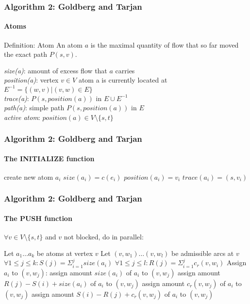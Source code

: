 \documentclass{beamer}
\begin{document}
\begin{frame}
\frametitle{Algorithm 2: Goldberg and Tarjan}
\framesubtitle{Atoms}
\begin{block}{Definition: Atom}
An atom $a$ is the maximal quantity of flow that so far moved the exact path $P(s,v)$.\\
\end{block}

\textit{size(a)}: amount of excess flow that $a$ carries \\
\textit{position(a)}: vertex $v\in V$ atom a is currently located at\\
$E^{-1} = \{(w,v)\vert (v,w) \in E \}$ \\
\textit{trace(a)}: $P(s, position(a))$ in $E \cup  E^{-1}$ \\
\textit{path(a)}: simple path $P(s, position(a))$ in $E$ \\
\textit{active atom}: $position(a) \in V \setminus \{s, t\}$
\end{frame}

\begin{frame}
\frametitle{Algorithm 2: Goldberg and Tarjan}
\framesubtitle{The INITIALIZE function}
	\begin{algorithmic}[1]
		\State create new atom $a_i$
		\State $size(a_i) = c(e_i)$
		\State $position(a_i) = v_i$
		\State $trace(a_i) = (s,v_i)$		
	\EndFor
	\EndFunction
	\end{algorithmic}
\end{frame}

\begin{frame}[shrink]
\frametitle{Algorithm 2: Goldberg and Tarjan}
\framesubtitle{The PUSH function}
$\forall v \in V \setminus \{s,t\}$ and $v$ not blocked, do in parallel:
	\begin{algorithmic}[1]
	\State Let $a_1 \dots a_k$ be atoms at vertex $v$
	\State Let $(v,w_1) \dots (v,w_l)$ be admissible arcs at $v$
	\State $\forall 1 \leq j \leq k: S(j) = \Sigma_{i=1}^{j} size(a_i)$
	\State $\forall 1 \leq j \leq l: R(j) = \Sigma_{i=1}^{j} c_r(v,w_i)$
	\State Assign $a_i$ to $(v, w_j)$:
			\State assign amount $size(a_i)$ of $a_i$ to $(v,w_j)$
		\Else
			\State assign amount $R(j)-S(i)+size(a_i)$ of $a_i$ to $(v,w_j)$
		\EndIf
	\EndIf
			\State assign amount $c_r(v,w_j)$ of $a_i$ to $(v,w_j)$
		\Else
			\State assign amount $S(i)-R(j)+c_r(v,w_j)$ of $a_i$ to $(v,w_j)$
		\EndIf
	\EndIf
	\EndFunction
	\end{algorithmic}
\end{frame}
\end{document}

